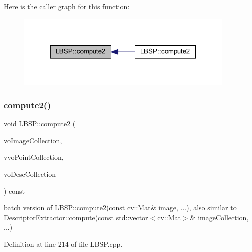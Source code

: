Here is the caller graph for this function\+:\nopagebreak
\begin{figure}[H]
\begin{center}
\leavevmode
\includegraphics[width=298pt]{class_l_b_s_p_ab61148341758dbc004660761bca04f84_icgraph}
\end{center}
\end{figure}
\mbox{\label{class_l_b_s_p_af02407f0a1657cd3e2b955aa250d064e}} 
\subsubsection{\texorpdfstring{compute2()}{compute2()}\hspace{0.1cm}{\footnotesize\ttfamily [2/2]}}
{\footnotesize\ttfamily void L\+B\+S\+P\+::compute2 (\begin{DoxyParamCaption}\item[{const std\+::vector$<$ cv\+::\+Mat $>$ \&}]{vo\+Image\+Collection,  }\item[{std\+::vector$<$ std\+::vector$<$ cv\+::\+Key\+Point $>$ $>$ \&}]{vvo\+Point\+Collection,  }\item[{std\+::vector$<$ cv\+::\+Mat $>$ \&}]{vo\+Desc\+Collection }\end{DoxyParamCaption}) const}



batch version of \mbox{\hyperlink{class_l_b_s_p_ab61148341758dbc004660761bca04f84}{L\+B\+S\+P\+::compute2}}(const cv\+::\+Mat\& image, ...), also similar to Descriptor\+Extractor\+::compute(const std\+::vector$<$cv\+::\+Mat$>$\& image\+Collection, ...) 



Definition at line 214 of file L\+B\+S\+P.\+cpp.


